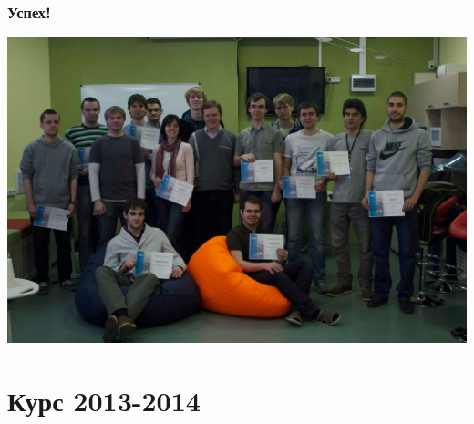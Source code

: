 \begin{frame}
  \frametitle{Успех!}
  \includegraphics[width=\textwidth]{linux_courses_certificates1.jpg}
\end{frame}

\section[2013]{Курс 2013-2014}

